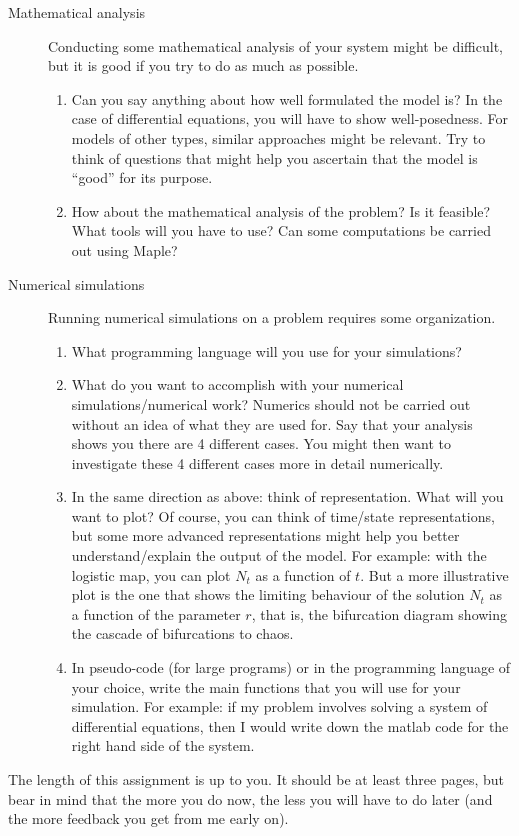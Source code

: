 \documentclass[12pt]{article}
\theoremstyle{plain}
\begin{document}
\begin{description}
\item[Mathematical analysis]
Conducting some mathematical analysis of your system might be difficult, but it is good if you try to do as much as possible.
\begin{enumerate}
\item Can you say anything about how well formulated the model is? In the case of differential equations, you will have to show well-posedness. For models of other types, similar approaches might be relevant. Try to think of questions that might help you ascertain that the model is ``good'' for its purpose.
\item How about the mathematical analysis of the problem? Is it feasible? What tools will you have to use? Can some computations be carried out using Maple?
\end{enumerate}
\item[Numerical simulations] Running numerical simulations on a problem requires some organization.
\begin{enumerate}
\item What programming language will you use for your simulations?
\item What do you want to accomplish with your numerical simulations/numerical work? Numerics should not be carried out without an idea of what they are used for. Say that your analysis shows you there are 4 different cases. You might then want to investigate these 4 different cases more in detail numerically. 
\item In the same direction as above: think of representation. What will you want to plot? Of course, you can think of time/state representations, but some more advanced representations might help you better understand/explain the output of the model. For example: with the logistic map, you can plot $N_t$ as a function of $t$. But a more illustrative plot is the one that shows the limiting behaviour of the solution $N_t$ as a function of the parameter $r$, that is, the bifurcation diagram showing the cascade of bifurcations to chaos.
\item In pseudo-code (for large programs) or in the programming language of your choice, write the main functions that you will use for your simulation. For example: if my problem involves solving a system of differential equations, then I would write down the matlab code for the right hand side of the system. 
\end{enumerate}
\end{description}
The length of this assignment is up to you. It should be at least three pages, but bear in mind that the more you do now, the less you will have to do later (and the more feedback you get from me early on).
\end{document}
